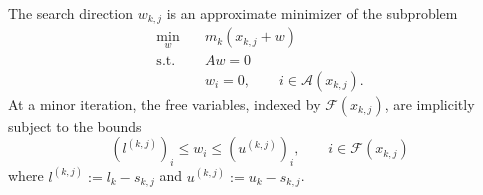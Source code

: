 \documentclass[pdflatex,sn-mathphys-num]{sn-jnl}%
\theoremstyle{thmstyleone}%
\newcommand{\calA}{{\mathcal{A}}}
\newcommand{\calF}{{\mathcal{F}}}
\begin{document}
The search direction $w_{k,j}$ is an approximate minimizer of the subproblem
\begin{subequations}\label{pb:minor_subpb}
	\begin{align}
		\min_w \quad & m_k(x_{k,j}+w) \\
		\text{s.t.} \quad & Aw=0 \label{subeq:minor_subpb_eq_cons} \\
		& w_i = 0, \qquad i \in \calA(x_{k,j}) \label{subeq:minor_subpb_fix_bounds}.
	\end{align}
\end{subequations}
At a minor iteration, the free variables, indexed by $\calF(x_{k,j})$, are implicitly subject to the bounds 
\begin{equation}\label{subeq:minor_subpb_bounds}
	\left(l^{(k,j)}\right)_i \le w_i \le \left(u^{(k,j)}\right)_i, \qquad i \in \calF(x_{k,j})
\end{equation}
where $l^{(k,j)}:= l_k - s_{k,j}$ and $u^{(k,j)}:= u_k - s_{k,j}$.
\end{document}
